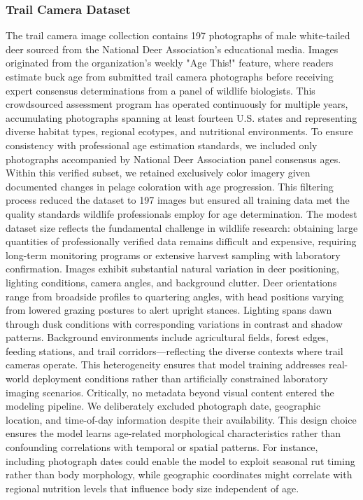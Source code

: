 \documentclass{iopjournal}
\begin{document}
\subsubsection{Trail Camera Dataset}
The trail camera image collection contains 197 photographs of male white-tailed deer sourced from the National Deer Association's educational media. Images originated from the organization's weekly "Age This!" feature, where readers estimate buck age from submitted trail camera photographs before receiving expert consensus determinations from a panel of wildlife biologists. This crowdsourced assessment program has operated continuously for multiple years, accumulating photographs spanning at least fourteen U.S. states and representing diverse habitat types, regional ecotypes, and nutritional environments.
To ensure consistency with professional age estimation standards, we included only photographs accompanied by National Deer Association panel consensus ages. Within this verified subset, we retained exclusively color imagery given documented changes in pelage coloration with age progression. This filtering process reduced the dataset to 197 images but ensured all training data met the quality standards wildlife professionals employ for age determination. The modest dataset size reflects the fundamental challenge in wildlife research: obtaining large quantities of professionally verified data remains difficult and expensive, requiring long-term monitoring programs or extensive harvest sampling with laboratory confirmation.
Images exhibit substantial natural variation in deer positioning, lighting conditions, camera angles, and background clutter. Deer orientations range from broadside profiles to quartering angles, with head positions varying from lowered grazing postures to alert upright stances. Lighting spans dawn through dusk conditions with corresponding variations in contrast and shadow patterns. Background environments include agricultural fields, forest edges, feeding stations, and trail corridors—reflecting the diverse contexts where trail cameras operate. This heterogeneity ensures that model training addresses real-world deployment conditions rather than artificially constrained laboratory imaging scenarios.
Critically, no metadata beyond visual content entered the modeling pipeline. We deliberately excluded photograph date, geographic location, and time-of-day information despite their availability. This design choice ensures the model learns age-related morphological characteristics rather than confounding correlations with temporal or spatial patterns. For instance, including photograph dates could enable the model to exploit seasonal rut timing rather than body morphology, while geographic coordinates might correlate with regional nutrition levels that influence body size independent of age.
\end{document}
